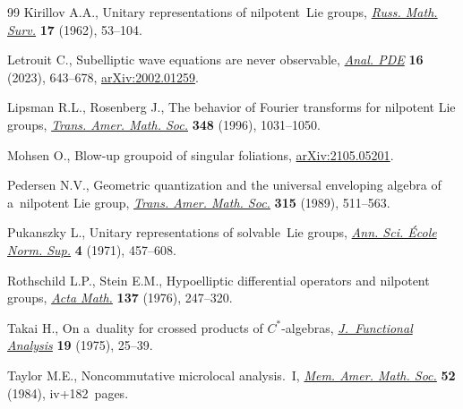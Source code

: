 \documentclass[10pt,a4paper]{article}
\numberwithin{equation}{section}
\theoremstyle{definition}
\begin{document}
\begin{thebibliography}{99}
Kirillov A.A., Unitary representations of nilpotent~{L}ie groups,
 \href{https://doi.org/10.1070/RM1962v017n04ABEH004118}{\textit{Russ. Math.
 Surv.}} \textbf{17} (1962), 53--104.

Letrouit C., Subelliptic wave equations are never observable,
 \href{https://doi.org/10.2140/apde.2023.16.643}{\textit{Anal. PDE}}
 \textbf{16} (2023), 643--678,
 \href{https://arxiv.org/abs/2002.01259}{arXiv:2002.01259}.

Lipsman R.L., Rosenberg J., The behavior of {F}ourier transforms for nilpotent
 {L}ie groups,
 \href{https://doi.org/10.1090/S0002-9947-96-01583-8}{\textit{Trans. Amer.
 Math. Soc.}} \textbf{348} (1996), 1031--1050.

Mohsen O., Blow-up groupoid of singular foliations,
 \href{https://arxiv.org/abs/2105.05201}{arXiv:2105.05201}.

Pedersen N.V., Geometric quantization and the universal enveloping algebra of a~nilpotent {L}ie group, \href{https://doi.org/10.2307/2001294}{\textit{Trans.
 Amer. Math. Soc.}} \textbf{315} (1989), 511--563.

Pukanszky L., Unitary representations of solvable~{L}ie groups,
 \href{https://doi.org/10.24033/asens.1218}{\textit{Ann. Sci. \'Ecole Norm.
 Sup.}} \textbf{4} (1971), 457--608.

Rothschild L.P., Stein E.M., Hypoelliptic differential operators and nilpotent
 groups, \href{https://doi.org/10.1007/BF02392419}{\textit{Acta Math.}}
 \textbf{137} (1976), 247--320.

Takai H., On a~duality for crossed products of {$C^{\ast} $}-algebras,
 \href{https://doi.org/10.1016/0022-1236(75)90004-x}{\textit{J.~Functional
 Analysis}} \textbf{19} (1975), 25--39.

Taylor M.E., Noncommutative microlocal analysis.~{I},
 \href{https://doi.org/10.1090/memo/0313}{\textit{Mem. Amer. Math. Soc.}}
 \textbf{52} (1984), iv+182~pages.

\end{thebibliography}
\end{document}

